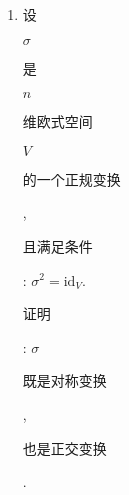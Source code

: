 \documentclass[10pt]{article}
\begin{document}
\begin{enumerate}
  \item \begin{CJK}{UTF8}{mj}设\end{CJK} $\sigma$ \begin{CJK}{UTF8}{mj}是\end{CJK} $n$ \begin{CJK}{UTF8}{mj}维欧式空间\end{CJK} $V$ \begin{CJK}{UTF8}{mj}的一个正规变换\end{CJK}, \begin{CJK}{UTF8}{mj}且满足条件\end{CJK}: $\sigma^{2}=\mathrm{id}_{V}$. \begin{CJK}{UTF8}{mj}证明\end{CJK}: $\sigma$ \begin{CJK}{UTF8}{mj}既是对称变换\end{CJK}, \begin{CJK}{UTF8}{mj}也是正交变换\end{CJK}.

\end{enumerate}
\end{document}
